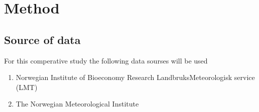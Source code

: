 \section{Method}

\subsection{Source of data}

For this comperative study the following data sourses will be used
\begin{enumerate}
	\item Norwegian Institute of Bioeconomy Research LandbruksMeteorologisk service (LMT)
	\item The Norwegian Meteorological Institute
\end{enumerate}

